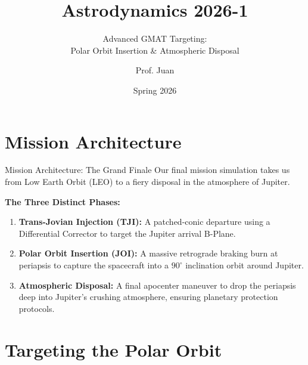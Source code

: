 \documentclass[11pt]{beamer}
\title[Jupiter Polar Mission]{Astrodynamics 2026-1}
\subtitle{Advanced GMAT Targeting: \\ Polar Orbit Insertion \& Atmospheric Disposal}
\author{Prof. Juan}
\institute{Universidad de Antioquia - Aerospace Engineering}
\date{Spring 2026}
\begin{document}
\begin{frame}
    \titlepage
\end{frame}

\section{Mission Architecture}

\begin{frame}{Mission Architecture: The Grand Finale}
    Our final mission simulation takes us from Low Earth Orbit (LEO) to a fiery disposal in the atmosphere of Jupiter. 
    
    \vspace{0.3cm}
    \textbf{The Three Distinct Phases:}
    \begin{enumerate}
        \item \textbf{Trans-Jovian Injection (TJI):} A patched-conic departure using a Differential Corrector to target the Jupiter arrival B-Plane.
        \item \textbf{Polar Orbit Insertion (JOI):} A massive retrograde braking burn at periapsis to capture the spacecraft into a $90^\circ$ inclination orbit around Jupiter.
        \item \textbf{Atmospheric Disposal:} A final apocenter maneuver to drop the periapsis deep into Jupiter's crushing atmosphere, ensuring planetary protection protocols.
    \end{enumerate}
\end{frame}

\section{Targeting the Polar Orbit}
\end{document}
